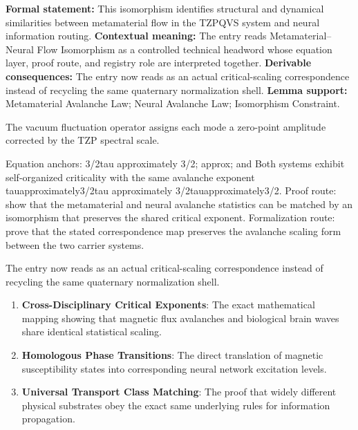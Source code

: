 \begingroup\footnotesize\setlength{\emergencystretch}{3em}\sloppy
\textbf{Formal statement:} This isomorphism identifies structural and dynamical similarities between metamaterial flow in the TZPQVS system and neural information routing. \textbf{Contextual meaning:} The entry reads Metamaterial--Neural Flow Isomorphism as a controlled technical headword whose equation layer, proof route, and registry role are interpreted together. \textbf{Derivable consequences:} The entry now reads as an actual critical-scaling correspondence instead of recycling the same quaternary normalization shell. \textbf{Lemma support:} Metamaterial Avalanche Law; Neural Avalanche Law; Isomorphism Constraint.\par
\endgroup

The vacuum fluctuation operator assigns each mode a zero-point amplitude corrected by the TZP spectral scale.

Equation anchors: 3/2tau approximately 3/2; approx; and Both systems exhibit self-organized criticality with the same avalanche exponent tauapproximately3/2tau approximately 3/2tauapproximately3/2. Proof route: show that the metamaterial and neural avalanche statistics can be matched by an isomorphism that preserves the shared critical exponent. Formalization route: prove that the stated correspondence map preserves the avalanche scaling form between the two carrier systems.

The entry now reads as an actual critical-scaling correspondence instead of recycling the same quaternary normalization shell.
\endgroup

\begin{enumerate}[leftmargin=1.6em,itemsep=6pt,topsep=4pt]
\item \textbf{Cross-Disciplinary Critical Exponents}: The exact mathematical mapping showing that magnetic flux avalanches and biological brain waves share identical statistical scaling.
\item \textbf{Homologous Phase Transitions}: The direct translation of magnetic susceptibility states into corresponding neural network excitation levels.
\item \textbf{Universal Transport Class Matching}: The proof that widely different physical substrates obey the exact same underlying rules for information propagation.
\end{enumerate}

